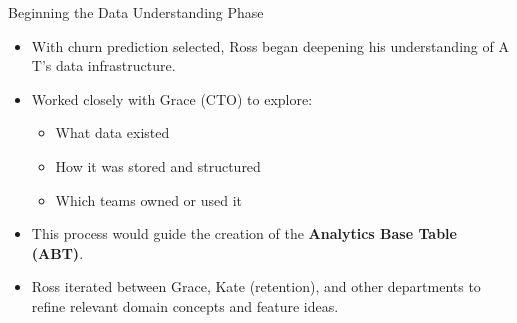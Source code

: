 \documentclass[aspectratio=169,xcolor=dvipsnames]{beamer}
\begin{document}
\begin{frame}{Beginning the Data Understanding Phase}

\begin{itemize}
  \item With churn prediction selected, Ross began deepening his understanding of A T’s data infrastructure.
  \item Worked closely with Grace (CTO) to explore:
  \begin{itemize}
    \item What data existed
    \item How it was stored and structured
    \item Which teams owned or used it
  \end{itemize}
  \item This process would guide the creation of the \textbf{Analytics Base Table (ABT)}.
  \item Ross iterated between Grace, Kate (retention), and other departments to refine relevant domain concepts and feature ideas.
\end{itemize}

\end{frame}
\end{document}
